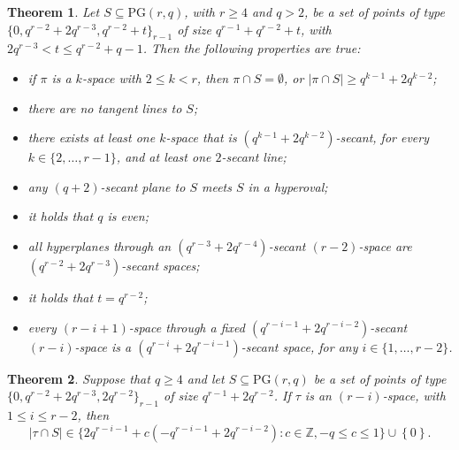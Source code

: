 \documentclass[10pt,a4paper]{amsart}
\newtheorem{theorem}{Theorem}
\newcommand{\PG}{\mathrm{PG}}
\newcommand{\set}[1]{ \left \{ #1 \right \} }
\begin{document}
\begin{theorem} \label{th:propgenkmarcspace}
Let $S \subseteq \PG(r,q)$, with $r\geq 4$ and $q>2$, be a set of points of type $\{0,q^{r-2}+2q^{r-3},q^{r-2}+t\}_{r-1}$  of size $q^{r-1}+q^{r-2}+t$, with $2q^{r-3}< t \leq q^{r-2}+q-1$. Then the following properties are true:
\begin{itemize}
    \item[(i)] if $\pi$ is a $k$-space with $2 \leq k < r$, then $\pi \cap S = \emptyset$, or $|\pi \cap S| \geq q^{k-1}+2q^{k-2}$;
    \item[(ii)] there are no tangent lines to $S$;
    \item[(iii)] there exists at least one $k$-space that is $(q^{k-1}+2q^{k-2})$-secant, for every $k \in \{2,\ldots,r-1\}$, and at least one $2$-secant line; 
    \item[(iv)] any $(q+2)$-secant plane to $S$ meets $S$ in a hyperoval;
    \item[(v)] it holds that $q$ is even;
    \item[(vi)] all hyperplanes through an $(q^{r-3}+2q^{r-4})$-secant $(r-2)$-space are $(q^{r-2}+2q^{r-3})$-secant spaces; 
    \item[(vii)] it holds that $t=q^{r-2}$;
    \item[(viii)] every $(r-i+1)$-space through a fixed $(q^{r-i-1}+2q^{r-i-2})$-secant $(r-i)$-space is a $(q^{r-i}+2q^{r-i-1})$-secant space, for any $i \in \{1,\ldots,r-2\}$. 
\end{itemize}
\end{theorem}

\begin{theorem} 
\label{th:intersectionspaces}
Suppose that $q\geq 4$ and let $S \subseteq \PG(r,q)$ be a set of points of type $\{0,q^{r-2}+2q^{r-3},2q^{r-2}\}_{r-1}$ of size $q^{r-1}+2q^{r-2}$.
If $\tau$ is an $(r-i)$-space, with $1 \leq i \leq r-2$, then
\[
 |\tau \cap S| \in \{2q^{r-i-1}+c(-q^{r-i-1}+2q^{r-i-2}) \colon c \in \mathbb{Z}, -q \leq c \leq 1\} \cup \set 0.
\]
\end{theorem}
\end{document}

